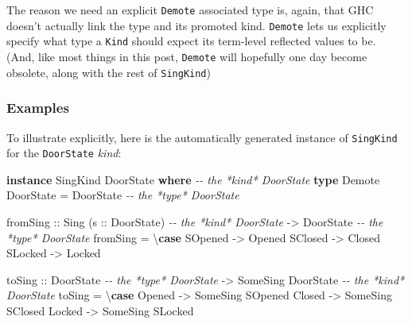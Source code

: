 \documentclass[]{article}
\newenvironment{Shaded}{}{}
\newcommand{\CommentTok}[1]{\textcolor[rgb]{0.38,0.63,0.69}{\textit{#1}}}
\newcommand{\DataTypeTok}[1]{\textcolor[rgb]{0.56,0.13,0.00}{#1}}
\newcommand{\KeywordTok}[1]{\textcolor[rgb]{0.00,0.44,0.13}{\textbf{#1}}}
\newcommand{\NormalTok}[1]{#1}
\newcommand{\OtherTok}[1]{\textcolor[rgb]{0.00,0.44,0.13}{#1}}
\begin{document}
The reason we need an explicit \texttt{Demote} associated type is, again, that
GHC doesn't actually link the type and its promoted kind. \texttt{Demote} lets
us explicitly specify what type a \texttt{Kind} should expect its term-level
reflected values to be. (And, like most things in this post, \texttt{Demote}
will hopefully one day become obsolete, along with the rest of
\texttt{SingKind})

\subsubsection{Examples}\label{examples}

To illustrate explicitly, here is the automatically generated instance of
\texttt{SingKind} for the \texttt{DoorState} \emph{kind}:

\begin{Shaded}
\begin{Highlighting}[]
\KeywordTok{instance} \DataTypeTok{SingKind} \DataTypeTok{DoorState} \KeywordTok{where}       \CommentTok{{-}{-} the *kind* DoorState}
    \KeywordTok{type} \DataTypeTok{Demote} \DataTypeTok{DoorState} \OtherTok{=} \DataTypeTok{DoorState}   \CommentTok{{-}{-} the *type* DoorState}

\NormalTok{    fromSing}
\OtherTok{        ::} \DataTypeTok{Sing}\NormalTok{ (}\OtherTok{s ::} \DataTypeTok{DoorState}\NormalTok{)        }\CommentTok{{-}{-} the *kind* DoorState}
        \OtherTok{{-}\textgreater{}} \DataTypeTok{DoorState}                    \CommentTok{{-}{-} the *type* DoorState}
\NormalTok{    fromSing }\OtherTok{=}\NormalTok{ \textbackslash{}}\KeywordTok{case}
        \DataTypeTok{SOpened} \OtherTok{{-}\textgreater{}} \DataTypeTok{Opened}
        \DataTypeTok{SClosed} \OtherTok{{-}\textgreater{}} \DataTypeTok{Closed}
        \DataTypeTok{SLocked} \OtherTok{{-}\textgreater{}} \DataTypeTok{Locked}

\NormalTok{    toSing}
\OtherTok{        ::} \DataTypeTok{DoorState}                    \CommentTok{{-}{-} the *type* DoorState}
        \OtherTok{{-}\textgreater{}} \DataTypeTok{SomeSing} \DataTypeTok{DoorState}           \CommentTok{{-}{-} the *kind* DoorState}
\NormalTok{    toSing }\OtherTok{=}\NormalTok{ \textbackslash{}}\KeywordTok{case}
        \DataTypeTok{Opened} \OtherTok{{-}\textgreater{}} \DataTypeTok{SomeSing} \DataTypeTok{SOpened}
        \DataTypeTok{Closed} \OtherTok{{-}\textgreater{}} \DataTypeTok{SomeSing} \DataTypeTok{SClosed}
        \DataTypeTok{Locked} \OtherTok{{-}\textgreater{}} \DataTypeTok{SomeSing} \DataTypeTok{SLocked}
\end{Highlighting}
\end{Shaded}
\end{document}

